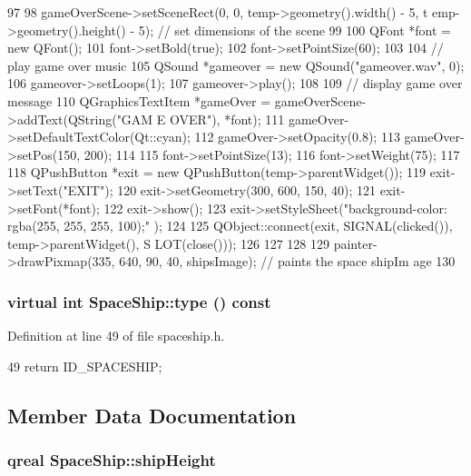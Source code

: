 \begin{DoxyCode}
{{{{97 
98                 gameOverScene->setSceneRect(0, 0, temp->geometry().width() - 5, t
      emp->geometry().height() - 5);       // set dimensions of the scene
99 
100                 QFont *font = new QFont();
101                 font->setBold(true);
102                 font->setPointSize(60);
103 
104                 // play game over music
105                 QSound *gameover = new QSound("gameover.wav", 0);
106                 gameover->setLoops(1);
107                 gameover->play();
108 
109                 // display game over message
110                 QGraphicsTextItem *gameOver = gameOverScene->addText(QString("GAM
      E OVER"), *font);
111                 gameOver->setDefaultTextColor(Qt::cyan);
112                 gameOver->setOpacity(0.8);
113                 gameOver->setPos(150, 200);
114 
115                 font->setPointSize(13);
116                 font->setWeight(75);
117 
118                 QPushButton *exit = new QPushButton(temp->parentWidget());
119                 exit->setText("EXIT");
120                 exit->setGeometry(300, 600, 150, 40);
121                 exit->setFont(*font);
122                 exit->show();
123                 exit->setStyleSheet("background-color: rgba(255, 255, 255, 100);"
      );
124 
125                 QObject::connect(exit, SIGNAL(clicked()), temp->parentWidget(), S
      LOT(close()));
126             }
127         }
128     }
129     painter->drawPixmap(335, 640, 90, 40, shipsImage); // paints the space shipIm
      age
130 }
\end{DoxyCode}
\hypertarget{class_space_ship_a4231df9fa04a8b82d07f62401000c1b7}{
\subsubsection[{type}]{\setlength{\rightskip}{0pt plus 5cm}virtual int SpaceShip::type () const}}
\label{class_space_ship_a4231df9fa04a8b82d07f62401000c1b7}


Definition at line 49 of file spaceship.h.


\begin{DoxyCode}
49 {return ID_SPACESHIP; }
\end{DoxyCode}


\subsection{Member Data Documentation}
\hypertarget{class_space_ship_a344d1e5b92d9286103aef6e1c27f0a76}{
\subsubsection[{shipHeight}]{\setlength{\rightskip}{0pt plus 5cm}qreal {\bf SpaceShip::shipHeight}}}
\label{class_space_ship_a344d1e5b92d9286103aef6e1c27f0a76}


